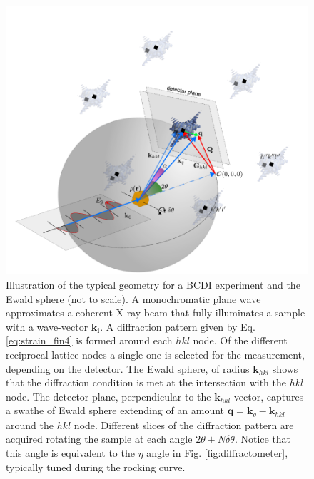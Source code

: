 \begin{figure}[H]
    \centering
    \includegraphics[width=\textwidth]{figures/Intro/ewald1.pdf}
    \caption{Illustration of the typical geometry for a BCDI experiment and the Ewald sphere (not to scale). A monochromatic plane wave approximates a 
    coherent X-ray beam that fully illuminates a sample with a wave-vector $\mathbf{k_i}$. A diffraction pattern given by Eq. 
    \ref{eq:strain_fin4} is formed around each $hkl$ node. Of the different reciprocal lattice nodes a single one is 
    selected for the measurement, depending on the detector. The Ewald sphere, of radius $\mathbf{k}_{hkl}$ shows that the diffraction condition is met
    at the intersection with the $hkl$ node. The detector plane, perpendicular to the $\mathbf{k}_{hkl}$ vector, captures 
    a swathe of Ewald sphere extending of an amount $\mathbf{q} = \mathbf{k}_{q} - \mathbf{k}_{hkl}$ around the $hkl$ node.
    Different slices of the diffraction pattern are acquired rotating the sample at each angle  $2\theta \pm N\delta \theta$. 
    Notice that this angle is equivalent to the $\eta$ angle in Fig. \ref{fig:diffractometer}, typically tuned during the 
    rocking curve.}
    \label{fig:ewald}
\end{figure}

